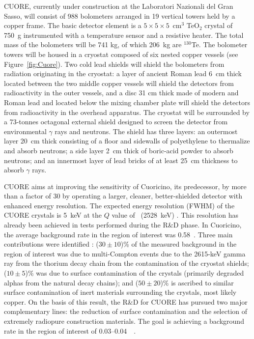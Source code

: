 \documentclass{PoS}
\begin{document}
CUORE, currently under construction at the Laboratori Nazionali del Gran Sasso, will consist of 988 bolometers arranged in 19 vertical towers held by a copper frame. The basic detector element is a $5\times5\times5$~cm$^{3}$ TeO$_{2}$ crystal of 750~g instrumented with a temperature sensor and a resistive heater. The total mass of the bolometers will be 741 kg, of which 206~kg are $^{130}$Te. The bolometer towers will be housed in a cryostat composed of six nested copper vessels (see Figure~\ref{fig:Cuore}). Two cold lead shields will shield the bolometers from radiation originating in the cryostat: a layer of ancient Roman lead 6~cm thick located between the two middle copper vessels will shield the detectors from radioactivity in the outer vessels, and a disc 31 cm thick made of modern and Roman lead and located below the mixing chamber plate will shield the detectors from radioactivity in the overhead apparatus. The cryostat will be surrounded by a 73-tonnes octagonal external shield designed to screen the detector from environmental $\gamma$ rays and neutrons. The shield has three layers: an outermost layer 20~cm thick consisting of a floor and sidewalls of polyethylene to thermalize and absorb neutrons; a side layer 2~cm thick of boric-acid powder to absorb neutrons; and an innermost layer of lead bricks of at least 25~cm thickness to absorb $\gamma$ rays.

CUORE aims at improving the sensitivity of Cuoricino, its predecessor, by more than a factor of 30 by operating a larger, cleaner, better-shielded detector with enhanced energy resolution. The expected energy resolution (FWHM) of the CUORE crystals is 5~keV at the $Q$ value of \TE\ (2528~keV) \cite{Artusa:2014lgv}. This resolution has already been achieved in tests performed during the R\&D phase. In Cuoricino, the average background rate in the region of interest was 0.58~\ckky. Three main contributions were identified \cite{Alessandria:2011rc}: ($30\pm10$)\% of the measured  background in the region of interest was due to multi-Compton events due to the 2615-keV gamma ray from the thorium decay chain from the contamination of the cryostat shields; ($10\pm5$)\% was due to surface contamination of the crystals (primarily degraded alphas from the natural decay chains); and ($50\pm20$)\% is ascribed to similar surface contamination of inert materials surrounding the crystals, most likely copper. On the basis of this result, the R\&D for CUORE has pursued two major complementary lines: the reduction of surface contamination and the selection of extremely radiopure construction materials. The goal is achieving a background rate in the region of interest of 0.03--0.04~\ckky\ \cite{Alessandria:2011rc}.
\end{document}
